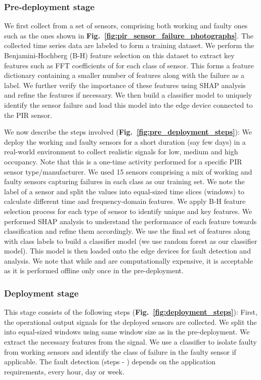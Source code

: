 \subsubsection{Pre-deployment stage} 
\label{sebsec:pre_deploy} 
We first collect \aout from a set of sensors, comprising both working and faulty ones such as the ones shown in {\bfseries Fig.~\ref{fig:pir_sensor_failure_photographs}}. The collected time series data are labeled to form a training dataset. We perform the Benjamini-Hochberg (B-H) feature selection on this dataset to extract key features such as FFT coefficients of \aout for each class of sensor. This forms a feature dictionary containing a smaller number of features along with the failure as a label. We further verify the importance of these features using SHAP analysis and refine the features if necessary.
We then build a classifier model to uniquely identify the sensor failure and load this model into the edge device connected to the PIR sensor. 

We now describe the steps involved ({\bfseries Fig.~\ref{fig:pre_deployment_steps}}):
 We deploy the working and faulty sensors for a short duration (say few days) in a real-world environment to collect realistic \aout signals for low, medium and high occupancy. 
Note that this is a one-time activity performed for a specific PIR sensor type/manufacturer. 
We used 15 sensors comprising a mix of working and faulty sensors capturing failures in each class as our training set.
 We note the label of a sensor and split the \aout values into equal-sized time slices (windows) to calculate different time and frequency-domain features. 
 We apply B-H feature selection process for each type of sensor to identify unique and key features. 
 We performed SHAP analysis to understand the performance of each feature towards classification and refine them accordingly. 
 We use the final set of features along with class labels to build a classifier model (we use random forest as our classifier model). This model is then loaded onto the edge devices for fault detection and analysis. We note that while  and  are computationally expensive, it is acceptable as it is performed offline only once in the pre-deployment.

\subsubsection{Deployment stage} 
This stage consists of the following steps ({\bfseries Fig.~\ref{fig:deployment_steps}}): 
 First, the operational \aout output signals for the deployed sensors are collected. 
 We split the \aout into equal-sized windows using same window size as in the pre-deployment. 
 We extract the necessary features from the \aout signal. 
 We use a classifier to \ca isolate faulty from working sensors and \cb identify the class of failure in the faulty sensor if applicable. %
The fault detection (steps  - ) depends on the application requirements, \ie every hour, day or week. 







